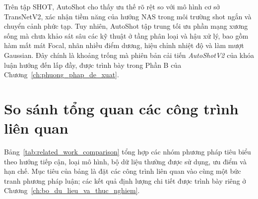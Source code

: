 Trên tập SHOT, AutoShot cho thấy ưu thế rõ rệt so với mô hình cơ sở TransNetV2, xác nhận tiềm năng của hướng NAS trong môi trường shot ngắn và chuyển cảnh phức tạp. Tuy nhiên, AutoShot tập trung tối ưu phần mạng xương sống mà chưa khảo sát sâu các kỹ thuật ở tầng phân loại và hậu xử lý, bao gồm hàm mất mát Focal, nhãn nhiều điểm dương, hiệu chỉnh nhiệt độ và làm mượt Gaussian. Đây chính là khoảng trống mà phiên bản cải tiến \textit{AutoShotV2} của khóa luận hướng đến lấp đầy, được trình bày trong Phần B của Chương~\ref{ch:phuong_phap_de_xuat}.

\section{So sánh tổng quan các công trình liên quan}
\label{sec:method_comparison_table}
Bảng~\ref{tab:related_work_comparison} tổng hợp các nhóm phương pháp tiêu biểu theo hướng tiếp cận, loại mô hình, bộ dữ liệu thường được sử dụng, ưu điểm và hạn chế. Mục tiêu của bảng là đặt các công trình liên quan vào cùng một bức tranh phương pháp luận; các kết quả định lượng chi tiết được trình bày riêng ở Chương~\ref{ch:bo_du_lieu_va_thuc_nghiem}.

